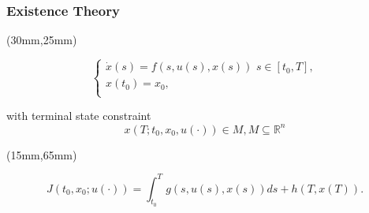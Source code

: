\begin{frame}
	\frametitle{Existence Theory}
	\begin{textblock*}{70mm}(30mm,25mm)
		\begin{greenbox}{}
			$$\left\{ \begin{array}{l}
			\dot{x}(s)=f(s,u(s),x(s))\,\,s\in [t_0,T], \\
			x(t_0)=x_0,\\
			\end{array}
			\right.$$
	
			with terminal state constraint
			$$x(T;t_0,x_0,u(\cdot))\in M, M\subseteq \mathbb{R}^n$$
			
		\end{greenbox}
	\end{textblock*}
	\begin{textblock*}{100mm}(15mm,65mm)
		\begin{yellowbox}{}
			$$J(t_0,x_0;u(\cdot))=\int_{t_0}^{T}g(s,u(s),x(s))ds+h(T,x(T)).$$
		\end{yellowbox}
	\end{textblock*}
\end{frame}

